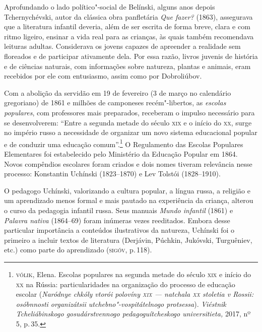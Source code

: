 Aprofundando o lado político"-social de Belínski, alguns anos depois
Tchernychévski, autor da clássica obra panfletária \emph{Que fazer?}
(1863), assegurava que a literatura infantil deveria, além de ser
escrita de forma breve, clara e com ritmo ligeiro, ensinar a vida real
para as crianças, às quais também recomendava leituras adultas.
Considerava os jovens capazes de apreender a realidade sem floreados e
de participar ativamente dela. Por essa razão, livros juvenis de
história e de ciências naturais, com informações sobre natureza, plantas
e animais, eram recebidos por ele com entusiasmo, assim como por
Dobroliúbov.

Com a abolição da servidão em 19 de fevereiro (3 de março no calendário
gregoriano) de 1861 e milhões de camponeses recém"-libertos, as
\emph{escolas} \emph{populares}, com professores mais preparados,
receberam o impulso necessário para se desenvolverem: ``Entre a segunda
metade do século \textsc{xix} e o início do \textsc{xx}, surge no império russo a
necessidade de organizar um novo sistema educacional popular e de
conduzir uma educação comum''.\footnote{\textsc{vólik}, Elena. Escolas populares
  na segunda metade do século \textsc{xix} e início do \textsc{xx} na Rússia:
  particularidades na organização do processo de educação escolar
  (\emph{Naródnye chkóly vtorói polovíny \textsc{xix} --- natchala \textsc{xx} stoletia v
  Rossii: osóbnnosti organizátsii utchebno"-vospitátelnogo protsessa}).
  \emph{Viéstnik Tcheliábinskogo gosudárstvennogo pedagoguítcheskogo
  universitieta,} 2017, nº 5, p.\,35.} O Regulamento das Escolas Populares
Elementares foi estabelecido pelo Ministério da Educação Popular em
1864. Novos compêndios escolares foram criados e dois nomes tiveram
relevância nesse processo: Konstantin Uchínski (1823--1870) e Lev
Tolstói (1828--1910).

O pedagogo Uchínski, valorizando a cultura popular, a língua russa, a
religião e um aprendizado menos formal e mais pautado na experiência da
criança, alterou o curso da pedagogia infantil russa. Seus manuais
\emph{Mundo infantil} (1861) e \emph{Palavra nativa} (1864--69) foram
inúmeras vezes reeditados. Embora desse particular importância a
conteúdos ilustrativos da natureza, Uchínski foi o primeiro a incluir
textos de literatura (Derjávin, Púchkin, Jukóvski, Turguêniev, etc.)
como parte do aprendizado (\textsc{sigóv}, p.\,118).

